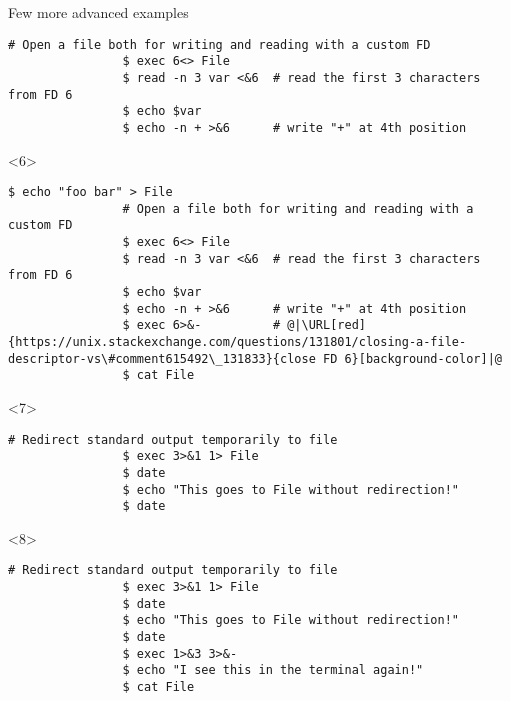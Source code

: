 \begin{frame}[fragile]{Few more advanced examples}
\begin{overlayarea}{\textwidth}{0.38\textheight}
\begin{onlyenv}
\begin{lstlisting}[style=MyBash, numbers=none, xrightmargin=3mm]
                # Open a file both for writing and reading with a custom FD
                $ exec 6<> File
                $ read -n 3 var <&6  # read the first 3 characters from FD 6
                $ echo $var 
                $ echo -n + >&6      # write "+" at 4th position
            \end{lstlisting}
        \end{onlyenv}
        \begin{onlyenv}<6>
            \begin{lstlisting}[style=MyBash, numbers=none, xrightmargin=3mm]
                $ echo "foo bar" > File
                # Open a file both for writing and reading with a custom FD
                $ exec 6<> File
                $ read -n 3 var <&6  # read the first 3 characters from FD 6
                $ echo $var 
                $ echo -n + >&6      # write "+" at 4th position
                $ exec 6>&-          # @|\URL[red]{https://unix.stackexchange.com/questions/131801/closing-a-file-descriptor-vs\#comment615492\_131833}{close FD 6}[background-color]|@
                $ cat File
            \end{lstlisting}
        \end{onlyenv}
        \begin{onlyenv}<7>
            \begin{lstlisting}[style=MyBash, numbers=none, xrightmargin=3mm]
                # Redirect standard output temporarily to file
                $ exec 3>&1 1> File
                $ date
                $ echo "This goes to File without redirection!"
                $ date
            \end{lstlisting}
        \end{onlyenv}
        \begin{onlyenv}<8>
            \begin{lstlisting}[style=MyBash, numbers=none, xrightmargin=3mm]
                # Redirect standard output temporarily to file
                $ exec 3>&1 1> File
                $ date
                $ echo "This goes to File without redirection!"
                $ date
                $ exec 1>&3 3>&-
                $ echo "I see this in the terminal again!"
                $ cat File
            \end{lstlisting}
        \end{onlyenv}
    \end{overlayarea}
    \begin{center}
        \begin{tikzpicture}

\end{tikzpicture}
\end{center}
\end{frame}
